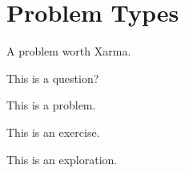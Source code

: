 \documentclass{ximera}
\begin{document}




\section{Problem Types}

\begin{xarmaBoost}
A problem worth Xarma.
\end{xarmaBoost}

\begin{question}
This is a question?
\end{question}

\begin{problem}
This is a problem.
\end{problem}

\begin{exercise}
This is an exercise.
\end{exercise}

\begin{exploration}
This is an exploration.
\end{exploration}
\end{document}
